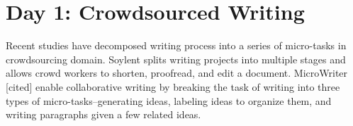 \documentclass[a4paper]{article}
\begin{document}
\section{Day 1: Crowdsourced Writing}
Recent studies have decomposed writing process into a series of micro-tasks in crowdsourcing domain. Soylent \cite{Bernstein:UIST10} splits writing projects into multiple stages and allows crowd workers to shorten, proofread, and edit a document. MicroWriter [cited] enable collaborative writing by breaking the task of writing into three types of micro-tasks--generating ideas, labeling ideas to organize them, and writing paragraphs given a few related ideas.

 

\end{document}
